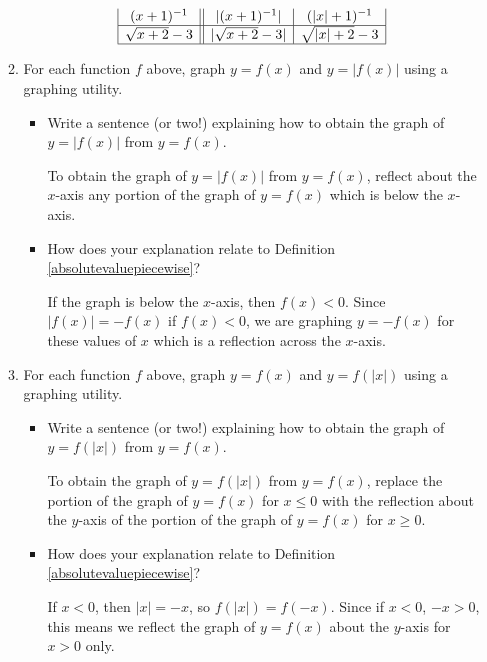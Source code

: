 \documentclass[11pt]{book}
\theoremstyle{definition}  %
\begin{document}
\begin{enumerate}
\begin{enumerate}
\[\begin{array}{|c||c|c|}
(x+1)^{-1}  &     |(x+1)^{-1}|      &    (|x|+1)^{-1}       \\  \hline   

\sqrt{x+2}-3&    | \sqrt{x+2}-3 |       &    \sqrt{|x|+2}-3    \\  \hline   

 \end{array} \]



\item For each function $f$ above, graph $y = f(x)$ and $y=|f(x)|$ using a graphing utility.

\begin{itemize}

\item Write a sentence (or two!) explaining how to obtain the graph of $y=|f(x)|$ from $y = f(x)$.  

To obtain the graph of $y=|f(x)|$ from $y=f(x)$, reflect about the $x$-axis any portion of the graph of $y=f(x)$ which is below the $x$-axis.

\item  How does your explanation relate to Definition \ref{absolutevaluepiecewise}?

If the graph is below the $x$-axis, then $f(x) < 0$.  Since $|f(x)| = -f(x)$ if $f(x) < 0$, we are graphing $y=-f(x)$ for these values of $x$ which is a reflection across the $x$-axis.

\end{itemize}

\item  For each function $f$ above, graph $y = f(x)$ and $y = f(|x|)$ using a graphing utility.

\begin{itemize}

\item Write a sentence (or two!) explaining how to obtain the graph of $y=f(|x|)$ from $y = f(x)$.  

To obtain the graph of $y=f(|x|)$ from $y=f(x)$, replace the portion of the graph of $y=f(x)$ for $x \leq 0$ with the reflection about the $y$-axis of the portion of the graph of $y=f(x)$ for $x \geq 0$.

\item  How does your explanation relate to Definition \ref{absolutevaluepiecewise}?

If $x < 0$, then $|x| = -x$, so $f(|x|) = f(-x)$.  Since if $x < 0$, $-x > 0$,  this  means we reflect the graph of $y=f(x)$ about the $y$-axis for $x>0$ only.


\end{itemize}
\end{enumerate}
\end{enumerate}
\end{document}
